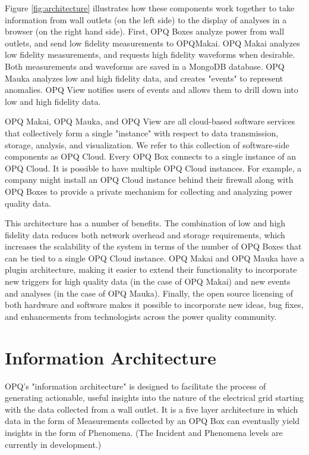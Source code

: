 Figure \ref{fig:architecture} illustrates how these components work together to take information from wall outlets (on the left side) to the display of analyses in a browser (on the right hand side).  First, OPQ Boxes analyze power from wall outlets, and send low fidelity measurements to OPQMakai. OPQ Makai analyzes low fidelity measurements, and requests high fidelity waveforms when desirable. Both measurements and waveforms are saved in a MongoDB database. OPQ Mauka analyzes low and high fidelity data, and creates "events" to represent anomalies. OPQ View notifies users of events and allows them to drill down into low and high fidelity data.

OPQ Makai, OPQ Mauka, and OPQ View are all cloud-based software services that collectively form a single "instance" with respect to data transmission, storage, analysis, and visualization. We refer to this collection of software-side components as OPQ Cloud. Every OPQ Box connects to a single instance of an OPQ Cloud. It is possible to have multiple OPQ Cloud instances. For example, a company might install an OPQ Cloud instance behind their firewall along with OPQ Boxes to provide a private mechanism for collecting and analyzing power quality data.

This architecture has a number of benefits. The combination of low and high fidelity data reduces both network overhead and storage requirements, which increases the scalability of the system in terms of the number of OPQ Boxes that can be tied to a single OPQ Cloud instance. OPQ Makai and OPQ Mauka have a plugin architecture, making it easier to extend their functionality to incorporate new triggers for high quality data (in the case of OPQ Makai) and new events and analyses (in the case of OPQ Mauka). Finally, the open source licensing of both hardware and software makes it possible to incorporate new ideas, bug fixes, and enhancements from technologists across the power quality community.

\section{Information Architecture}

OPQ's "information architecture" is designed to facilitate the process of generating actionable, useful insights into the nature of the electrical grid starting with the data collected from a wall outlet. It is a five layer architecture in which data in the form of Measurements collected by an OPQ Box can eventually yield insights in the form of Phenomena. (The Incident and Phenomena levels are currently in development.)

